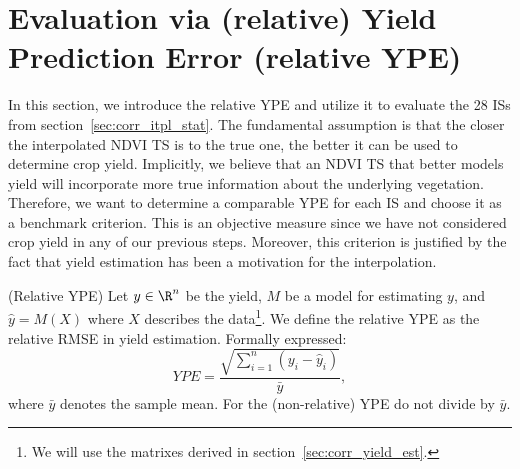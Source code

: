 \section{Evaluation via (relative) Yield Prediction Error (relative YPE)}{
    \label{sec:ndvi_corr_eval}
    In this section, we introduce the relative YPE and utilize it to evaluate the 28 {{IS}}s from section~\ref{sec:corr_itpl_stat}. 
    The fundamental assumption is that the closer the interpolated NDVI {TS} is to the true one, the better it can be used to determine crop yield. Implicitly, we believe that an NDVI {TS} that better models yield will incorporate more true information about the underlying vegetation. 
    Therefore, we want to determine a comparable YPE for each {{IS}} and choose it as a benchmark criterion. 
    This is an objective measure since we have not considered crop yield in any of our previous steps. Moreover, this criterion is justified by the fact that yield estimation has been a motivation for the interpolation.

    \begin{definition}(Relative YPE) \label{def:YPE}
        Let $y\in \R^n$ be the yield, $M$ be a model for estimating $y$, and $\hat y = M(X)$ where $X$ describes the data\footnote{We will use the matrixes derived in section~\ref{sec:corr_yield_est}.}. 
        We define the relative YPE as the relative RMSE in yield estimation. Formally expressed:
        \begin{equation}
            YPE = \frac{\sqrt{\sum_{i=1}^n(y_i - \hat y_i)}}{\bar y}, %
        \end{equation}
        where $\bar y$ denotes the sample mean. For the (non-relative) YPE do not divide by $\bar y$.
    \end{definition}

}
